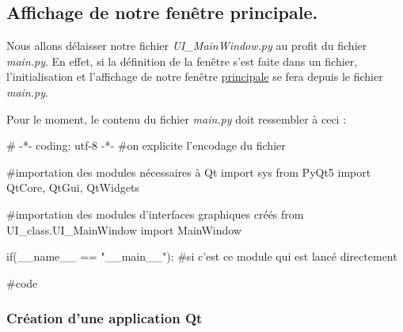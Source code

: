 \documentclass[12pt]{report}    %
\newcommand{\italic}[1]{{\itshape #1}}
\newcommand{\smallSkip}{\vskip 0.5cm}
\begin{document}
\subsection{Affichage de notre fenêtre principale.}

Nous allons délaisser notre fichier \italic{UI\_MainWindow.py} au profit du fichier \italic{main.py}. En effet, si la définition de la fenêtre s'est faite dans un fichier, l'initialisation et l'affichage de notre fenêtre \underline{principale} se fera depuis le fichier \italic{main.py}.\smallSkip

Pour le moment, le contenu du fichier \italic{main.py} doit ressembler à ceci :
\begin{pyCode}
# -*- coding: utf-8 -*-
#on  explicite l’encodage  du  fichier

#importation des modules nécessaires à Qt
import sys
from PyQt5 import QtCore, QtGui, QtWidgets

#importation des modules d'interfaces graphiques créés
from UI_class.UI_MainWindow import MainWindow


if(__name__ == "__main__"): #si c'est ce module qui est lancé directement

	#code
\end{pyCode}

\subsubsection{Création d'une application Qt}
\end{document}
